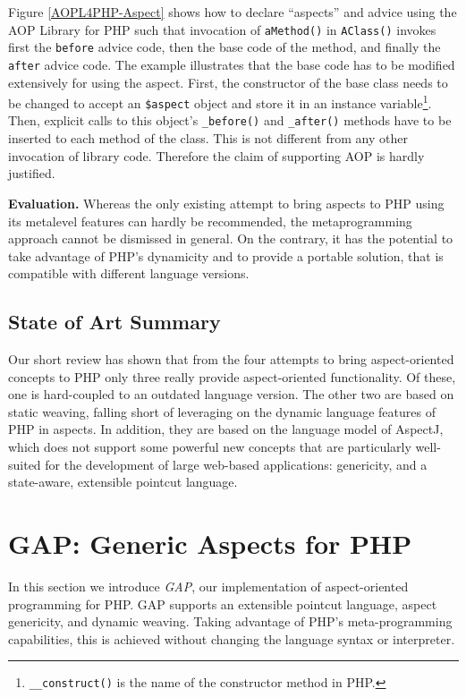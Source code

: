 \documentclass{acm_proc_article-sp}
\begin{document}
Figure \ref{AOPL4PHP-Aspect} shows how to declare ``aspects'' and
advice using the AOP Library for PHP such that invocation of
\texttt{aMethod()} in \texttt{AClass()} invokes first the
\texttt{before} advice code, then the base code of the method, and
finally the \texttt{after} advice code. The example illustrates
that the base code has to be modified extensively for using the
aspect. First, the constructor of the base class needs to be
changed to accept an \texttt{\$aspect} object and store it in an
instance variable\footnote{
%
\texttt{\_\_construct()} is the name of the constructor method in
PHP.
}. %
Then, explicit calls to this object's \texttt{\_before()} and
\texttt{\_after()} methods have to be inserted to each method of
the class. This is not different from any other invocation of
library code. Therefore the claim of supporting AOP is hardly
justified.

\textbf{Evaluation.} Whereas the only existing attempt to bring
aspects to PHP using its metalevel features can hardly be
recommended, the metaprogramming approach cannot be dismissed in
general. On the contrary, it has the potential to take advantage
of PHP's dynamicity and to provide a portable solution, that is
compatible with different language versions.

\subsection{State of Art Summary}
Our short review has shown that from the four attempts to bring
aspect-oriented concepts to PHP only three really provide
aspect-oriented functionality. Of these, one is hard-coupled to an
outdated language version. The other two are based on static
weaving, falling short of leveraging on the dynamic language
features of PHP in aspects. In addition, they are based on the
language model of AspectJ, which does not support some powerful
new concepts that are particularly well-suited for the development
of large web-based applications: genericity, and a state-aware,
extensible pointcut language. %

\section{GAP: Generic Aspects for PHP}
In this section we introduce \emph{GAP}, our implementation of
aspect-oriented programming for PHP. GAP supports an extensible
pointcut language, aspect genericity, and dynamic weaving. Taking
advantage of PHP's meta-programming capabilities, this is achieved
without changing the language syntax or interpreter.
\end{document}
